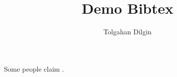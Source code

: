 \documentclass{article}
\title{Demo Bibtex}
\author{Tolgahan Dilgin}
\begin{document}


Some people claim \cite{diamond1994toward}.


\end{document}
